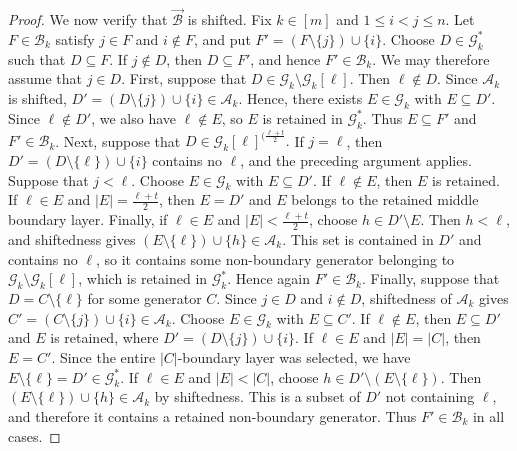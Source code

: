 \documentclass[10pt,a4paper]{amsart}
\begin{document}
\begin{proof}
We now verify that $\vec{\mathcal B}$ is shifted. Fix $k\in[m]$
and $1\leq i<j\leq n$. Let $F\in\mathcal B_k$ satisfy
$j\in F$ and $i\notin F$, and put
$
  F'=(F\setminus\{j\})\cup\{i\}.
$
Choose $D\in\mathcal G_k^{*}$ such that $D\subseteq F$. If
$j\notin D$, then $D\subseteq F'$, and hence $F'\in\mathcal B_k$.
We may therefore assume that $j\in D$.
First, suppose that
$
  D\in\mathcal G_k\setminus\mathcal G_k[\ell].
$
Then $\ell\notin D$. Since $\mathcal A_k$ is shifted,
$
  D'=(D\setminus\{j\})\cup\{i\}\in\mathcal A_k.
$
Hence, there exists $E\in\mathcal G_k$ with $E\subseteq D'$. Since
$\ell\notin D'$, we also have $\ell\notin E$, so $E$ is retained in
$\mathcal G_k^{*}$. Thus $E\subseteq F'$ and
$F'\in\mathcal B_k$.
Next, suppose that
$
  D\in\mathcal G_k[\ell]^{(\frac{\ell+t}{2}}.
$
If $j=\ell$, then $D'=(D\setminus\{\ell\})\cup\{i\}$ contains no
$\ell$, and the preceding argument applies. Suppose that $j<\ell$.
Choose $E\in\mathcal G_k$ with $E\subseteq D'$. If $\ell\notin E$,
then $E$ is retained. If $\ell\in E$ and
$|E|=\frac{\ell+t}{2}$, then $E=D'$ and $E$ belongs to the retained middle
boundary layer. Finally, if $\ell\in E$ and
$|E|<\frac{\ell+t}{2}$, choose
$
  h\in D'\setminus E.
$
Then $h<\ell$, and shiftedness gives
$
  (E\setminus\{\ell\})\cup\{h\}\in\mathcal A_k.
$
This set is contained in $D'$ and contains no $\ell$, so it contains
some non-boundary generator belonging to
$\mathcal G_k\setminus\mathcal G_k[\ell]$, which is retained in
$\mathcal G_k^{*}$. Hence again $F'\in\mathcal B_k$.
Finally, suppose that
$
  D=C\setminus\{\ell\}
$
for some generator $C$. Since
$j\in D$ and $i\notin D$, shiftedness of $\mathcal A_k$ gives
$
  C'=(C\setminus\{j\})\cup\{i\}\in\mathcal A_k.
$
Choose $E\in\mathcal G_k$ with $E\subseteq C'$. If $\ell\notin E$,
then $E\subseteq D'$ and $E$ is retained, where
$
  D'=(D\setminus\{j\})\cup\{i\}.
$
If $\ell\in E$ and $|E|=|C|$, then $E=C'$. Since the entire
$|C|$-boundary layer was selected, we have
$
  E\setminus\{\ell\}=D'\in\mathcal G_k^{*}.
$
If $\ell\in E$ and $|E|<|C|$, choose
$
  h\in D'\setminus(E\setminus\{\ell\}).
$
Then
$
  (E\setminus\{\ell\})\cup\{h\}\in\mathcal A_k
$
by shiftedness. This is a subset of $D'$ not containing $\ell$, and
therefore it contains a retained non-boundary generator. Thus
$F'\in\mathcal B_k$ in all cases.


\end{proof}
\end{document}
